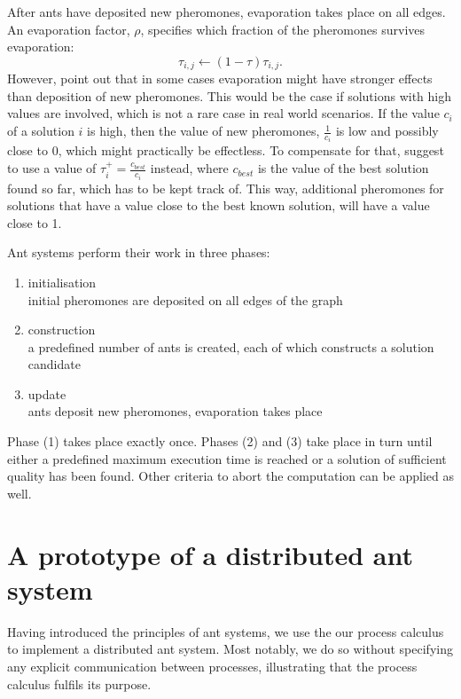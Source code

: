 After ants have deposited new pheromones, evaporation takes place on all edges. An evaporation factor, $\rho$, specifies which fraction of the pheromones survives evaporation:
\begin{equation}
  \label{eqn:evaporation}
  \tau_{i,j} \leftarrow \left( 1 - \tau \right) \tau_{i,j}.
\end{equation}
However, \cite{Bloecker} point out that in some cases evaporation might have stronger effects than deposition of new pheromones. This would be the case if solutions with high values are involved, which is not a rare case in real world scenarios. If the value $c_i$ of a solution $i$ is high, then the value of new pheromones, $\frac{1}{c_i}$ is low and possibly close to $0$, which might practically be effectless. To compensate for that, \cite{Bloecker} suggest to use a value of $\tau_i^+ = \frac{c_{best}}{c_i}$ instead, where $c_{best}$ is the value of the best solution found so far, which has to be kept track of. This way, additional pheromones for solutions that have a value close to the best known solution, will have a value close to 1.

Ant systems perform their work in three phases:
\begin{enumerate}
  \item initialisation \\
    initial pheromones are deposited on all edges of the graph
  \item construction \\
    a predefined number of ants is created, each of which constructs a solution candidate
  \item update \\
    ants deposit new pheromones, evaporation takes place
\end{enumerate}
Phase (1) takes place exactly once. Phases (2) and (3) take place in turn until either a predefined maximum execution time is reached or a solution of sufficient quality has been found. Other criteria to abort the computation can be applied as well.

\section{A prototype of a distributed ant system}
Having introduced the principles of ant systems, we use the our process calculus to implement a distributed ant system. Most notably, we do so without specifying any explicit communication between processes, illustrating that the process calculus fulfils its purpose.

